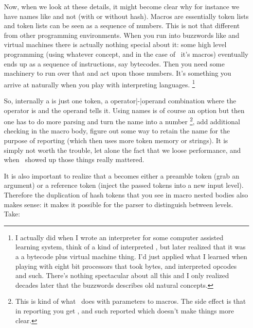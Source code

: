 \luatokentable\foo

Now, when we look at these details, it might become clear why for instance we
have  names like  and not  (with or
without hash). Macros are essentially token lists and token lists can be seen as
a sequence of numbers. This is not that different from other programming
environments. When you run into buzzwords like  and \quote
{virtual machines} there is actually nothing special about it: some high level
programming (using whatever concept, and in the case of \TEX\ it's macros)
eventually ends up as a sequence of instructions, say bytecodes. Then you need
some machinery to run over that and act upon those numbers. It's something you
arrive at naturally when you play with interpreting languages. \footnote {I
actually did when I wrote an interpreter for some computer assisted learning
system, think of a kind of interpreted \PASCAL, but later realized that it was a a
bytecode plus virtual machine thing. I'd just applied what I learned when playing
with eight bit processors that took bytes, and interpreted opcodes and such.
There's nothing spectacular about all this and I only realized decades later that
the buzzwords describes old natural concepts.}

So, internally a  is just one token, a operator|-|operand combination
where the operator is  and the operand tells
 it. Using names is of course an option but then one
has to do more parsing and turn the name into a number \footnote {This is kind of
what \METAPOST\ does with parameters to macros. The side effect is that in
reporting you get ,  and such reported which doesn't
make things more clear.}, add additional checking in the macro body, figure out
some way to retain the name for the purpose of reporting (which then uses more
token memory or strings). It is simply not worth the trouble, let alone the fact
that we loose performance, and when \TEX\ showed up those things really mattered.

It is also important to realize that a \type {#} becomes either a preamble token
(grab an argument) or a reference token (inject the passed tokens into a new
input level). Therefore the duplication of hash tokens \type {##} that you see in
macro nested bodies also makes sense: it makes it possible for the parser to
distinguish between levels. Take:

\starttyping[option=TEX]
\stoptyping


